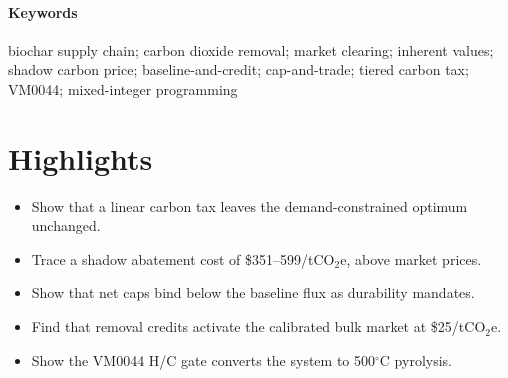 
\begin{abstract}
Biochar is among the most scalable engineered carbon dioxide removal (CDR)
pathways, but its economics depend on carbon accounting rather than energy
sales, while existing models treat carbon policy as exogenous. We present a
multi-product biochar supply chain model for Wisconsin (72 counties, 13
feedstocks, two pyrolysis temperatures, price-responsive demand) in the
market-clearing framework of Sampat et al.~\cite{sampat2019}, with
mass-balance duals as spatial equilibrium prices. We embed
baseline-and-credit, cap-and-trade, and tiered-tax policy architectures, the
last with H/C-gated VM0044-inspired removal crediting. The no-policy
equilibrium yields 2.30~Mt biochar/yr, \$708~M/yr surplus, and 1.60~Mt
CO$_2$e/yr net removal. A linear carbon tax leaves this optimum unchanged,
and net emission caps bind only below the system's own net flux---then
mandating production expansion and 500$^\circ$C conversion at
\$110--330/tCO$_2$e; removal credits instead activate the \$250/t bulk
market at \$25/tCO$_2$e under the calibrated step demand and mobilize most
near-term biomass at \$200/tCO$_2$e (surplus \$3.36~B/yr). The cap's shadow
abatement cost (fixed-layout LP dual,
\$351--599/tCO$_2$e) exceeds observed allowance and credit prices, and the
VM0044 H/C gate reshapes temperature selection. Under the calibrated demand,
policy design---not stringency---sets the scale, technology, and spatial
structure of biochar CDR.
\end{abstract}

\paragraph{Keywords} biochar supply chain; carbon dioxide removal; market
clearing; inherent values; shadow carbon price; baseline-and-credit;
cap-and-trade; tiered carbon tax; VM0044; mixed-integer programming

\section*{Highlights}
\begin{itemize}
\item Show that a linear carbon tax leaves the demand-constrained optimum
unchanged.
\item Trace a shadow abatement cost of \$351--599/tCO$_2$e, above market
prices.
\item Show that net caps bind below the baseline flux as durability mandates.
\item Find that removal credits activate the calibrated bulk market at \$25/tCO$_2$e.
\item Show the VM0044 H/C gate converts the system to 500$^\circ$C pyrolysis.
\end{itemize}
